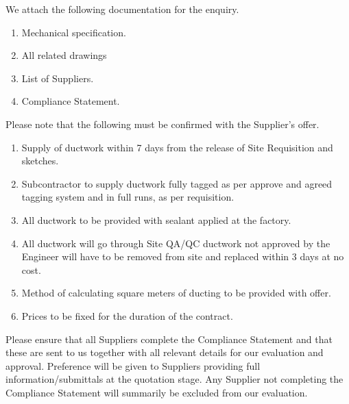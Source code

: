 \documentclass[a4paper,12pt,oneside]{article}
\begin{document}
\begin{mcdletter}

We attach the following documentation for the enquiry.

\begin{enumerate}    
\item Mechanical specification.
\item All related drawings
\item List of Suppliers.
\item Compliance Statement.
\end{enumerate}

Please note that the following must be confirmed  with the Supplier's offer.

\begin{enumerate}
\item Supply of ductwork within 7 days from the release of Site Requisition and sketches.

\item Subcontractor to supply ductwork fully tagged as per approve and agreed tagging system and in full runs, as per requisition.

\item All ductwork to be provided with sealant applied at the factory.

\item All ductwork will go through Site QA/QC ductwork not approved by the Engineer will have to be removed from site and replaced within 3 days at no cost.

\item Method of calculating square meters of ducting to be provided with offer. 

\item Prices to be fixed for the duration of the contract.

\end{enumerate}

Please ensure that all Suppliers complete the Compliance Statement and that these are sent to us together with all relevant details for our evaluation and approval. Preference will be given to Suppliers providing full information/submittals at the quotation stage. Any Supplier not completing the Compliance Statement will summarily be excluded from our evaluation.
\end{mcdletter}
\end{document}
